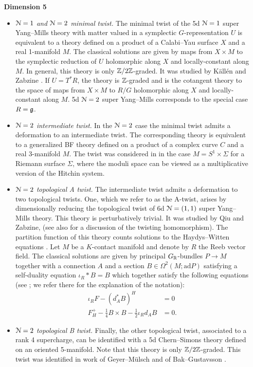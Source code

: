 \documentclass[10pt, oneside]{article}
\begin{document}
\textbf{Dimension 5}
\begin{itemize}
 \item \emph{$\mathcal{N}=1$ and $\mathcal{N}=2$ minimal twist.} The minimal twist of the 5d $\mathcal N=1$ super Yang--Mills theory with matter valued in a symplectic $G$-representation $U$ is equivalent to a theory defined on a product of a Calabi--Yau surface $X$ and a real 1-manifold $M$. The classical solutions are given by maps from $X\times M$ to the symplectic reduction of $U$ holomorphic along $X$ and locally-constant along $M$. In general, this theory is only $\mathbb Z/2\mathbb Z$-graded. It was studied by K\"all\'en and Zabzine \cite{KallenZabzine}. If $U=T^* R$, the theory is $\mathbb Z$-graded and is the cotangent theory to the space of maps from $X\times M$ to $R/G$ holomorphic along $X$ and locally-constant along $M$. 5d $\mathcal N=2$ super Yang--Mills corresponds to the special case $R=\mathfrak g$.
 \item \emph{$\mathcal{N}=2$ intermediate twist.} In the $\mathcal{N}=2$ case the minimal twist admits a deformation to an intermediate twist. The corresponding theory is equivalent to a generalized BF theory defined on a product of a complex curve $C$ and a real 3-manifold $M$. The twist was considered in \cite{ElliottPestun} in the case $M=S^1\times \Sigma$ for a Riemann surface $\Sigma$, where the moduli space can be viewed as a multiplicative version of the Hitchin system.
 \item \emph{$\mathcal{N}=2$ topological A twist.} The intermediate twist admits a deformation to two topological twists. One, which we refer to as the A-twist, arises by dimensionally reducing the topological twist of 6d $\mathcal{N}=(1, 1)$ super Yang--Mills theory. This theory is perturbatively trivial. It was studied by Qiu and Zabzine, \cite{QiuZabzine} (see also \cite{Anderson} for a discussion of the twisting homomorphism). The partition function of this theory counts solutions to the Haydys--Witten equations \cite{Haydys,WittenFivebranes}. Let $M$ be a $K$-contact manifold and denote by $R$ the Reeb vector field. The classical solutions are given by principal $G_\mathbb R$-bundles $P\rightarrow M$ together with a connection $A$ and a section $B\in\Omega^2(M; \mathrm{ad} P)$ satisfying a self-duality equation $\iota_R \ast B = B$ which together satisfy the following equations (see \cite[equations (4) and (5)]{QiuZabzine}; we refer there for the explanation of the notation):
\begin{align}
\iota_R F - (d_A^* B)^H &= 0 \\
F^+_H - \frac{1}{4}B\times B - \frac{1}{2}\iota_R d_A B &= 0.
\end{align} 
 \item \emph{$\mathcal{N}=2$ topological B twist.} Finally, the other topological twist, associated to a rank 4 supercharge, can be identified with a 5d Chern--Simons theory defined on an oriented 5-manifold. Note that this theory is only $\mathbb Z/2\mathbb Z$-graded. This twist was identified in work of Geyer--M\"ulsch and of Bak--Gustavsson \cite{GeyerMuelsch, BakGustavsson1,BakGustavsson2}.
\end{itemize}
\end{document}

